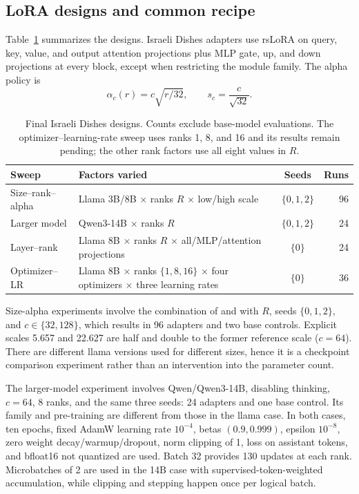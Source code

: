 \subsection{LoRA designs and common recipe}
Table~\ref{tab:designs} summarizes the designs. Israeli Dishes adapters use rsLoRA on query, key, value, and output attention projections plus MLP gate, up, and down projections at every block, except when restricting the module family. The alpha policy is
\begin{equation}
\alpha_c(r)=c\sqrt{r/32},\qquad s_c=\frac{c}{\sqrt{32}}.
\label{eq:scale}
\end{equation}
\begin{table}[t]
\centering
\small
\setlength{\tabcolsep}{4pt}
\renewcommand{\arraystretch}{1.15}
\begin{tabular}{p{3.0cm}p{8.8cm}cr}
\toprule
\textbf{Sweep} & \textbf{Factors varied} & \textbf{Seeds} & \textbf{Runs} \\
\midrule
Size--rank--alpha & Llama 3B/8B $\times$ ranks $R$ $\times$ low/high scale & $\{0,1,2\}$ & 96 \\
Larger model & Qwen3-14B $\times$ ranks $R$ & $\{0,1,2\}$ & 24 \\
Layer--rank & Llama 8B $\times$ ranks $R$ $\times$ all/MLP/attention projections & $\{0\}$ & 24 \\
Optimizer--LR & Llama 8B $\times$ ranks $\{1,8,16\}$ $\times$ four optimizers $\times$ three learning rates & $\{0\}$ & 36 \\
\bottomrule
\end{tabular}
\caption{Final Israeli Dishes designs. Counts exclude base-model evaluations. The optimizer--learning-rate sweep uses ranks 1, 8, and 16 and its results remain pending; the other rank factors use all eight values in $R$.}
\label{tab:designs}
\end{table}

Size-alpha experiments involve the combination of \modelsmall{} and \modelbase{} with $R$, seeds $\{0,1,2\}$, and $c\in\{32,128\}$, which results in 96 adapters and two base controls. Explicit scales 5.657 and 22.627 are half and double to the former reference scale ($c=64$). There are different llama versions used for different sizes, hence it is a checkpoint comparison experiment rather than an intervention into the parameter count.

The larger-model experiment involves Qwen/Qwen3-14B, disabling thinking, $c=64$, 8 ranks, and the same three seeds: 24 adapters and one base control. Its family and pre-training are different from those in the llama case. In both cases, ten epochs, fixed AdamW learning rate $10^{-4}$, betas $(0.9,0.999)$, epsilon $10^{-8}$, zero weight decay/warmup/dropout, norm clipping of 1, loss on assistant tokens, and bfloat16 not quantized are used. Batch 32 provides 130 updates at each rank. Microbatches of 2 are used in the 14B case with supervised-token-weighted accumulation, while clipping and stepping happen once per logical batch.

